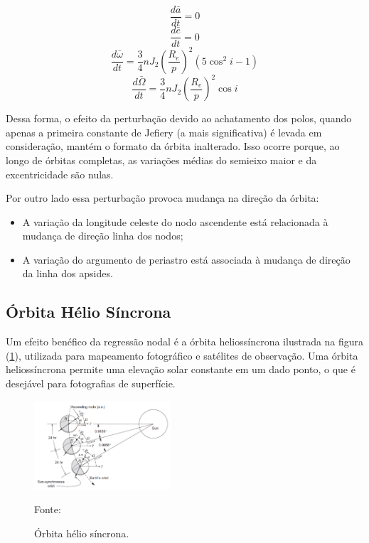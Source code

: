 \begin{equation}
\frac{d\bar{a}}{dt}=0
\end{equation}
\begin{equation}
\frac{d\bar{e}}{dt}=0
\end{equation}
\begin{equation}
\frac{d\bar{\omega}}{dt}=\frac{3}{4}nJ_2\left(\frac{R_e}{p}\right)^2(5\cos^2i-1)
\end{equation}
\begin{equation}
\frac{d\bar{\Omega}}{dt}=\frac{3}{4}nJ_2\left(\frac{R_e}{p}\right)^2\cos i
\end{equation}

\par Dessa forma, o efeito da perturbação devido ao achatamento dos polos, quando apenas a primeira constante de Jefiery (a mais significativa) é levada em consideração, mantém o formato da órbita inalterado. Isso ocorre porque, ao longo de órbitas completas, as variações médias do semieixo maior e da excentricidade são nulas.

\par Por outro lado essa perturbação provoca mudança na direção da órbita: 
\begin{itemize}
    \item A variação da longitude celeste do nodo ascendente está relacionada à mudança de direção linha dos nodos;
    \item A variação do argumento de periastro está associada à mudança de direção da linha dos apsides.
\end{itemize}

\subsection{Órbita Hélio Síncrona}
\par Um efeito benéfico da regressão nodal é a órbita heliossíncrona ilustrada na figura (\ref{fig:sol}), utilizada para mapeamento fotográfico e satélites de observação. Uma órbita heliossíncrona permite uma elevação solar constante em um dado ponto, o que é desejável para fotografias de superfície.

\begin{figure}[h]
        \centering
        \includegraphics[width=2in]{figuras/sol.png}
        \caption{Órbita hélio síncrona.}
        \footnotesize Fonte: \cite{livro:andre}
        \label{fig:sol}
\end{figure} 

